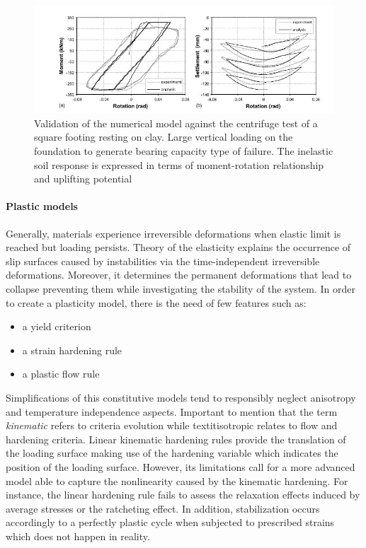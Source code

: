\documentclass[12pt,a4paper]{report}
\begin{document}
\begin{figure}[!h]
\centering
	\includegraphics[width=0.5 \linewidth]{"exper"}
	\caption{Validation of the numerical model against the centrifuge test of a square footing resting on clay. Large vertical loading on the foundation to generate bearing capacity type of failure. The inelastic soil response is expressed in terms of moment-rotation relationship and uplifting potential}
	\label{experimental}
\end{figure}

\paragraph{Plastic models} Generally, materials experience irreversible deformations when elastic limit is reached but loading persists. Theory of the elasticity explains the occurrence of slip surfaces caused by instabilities via the time-independent irreversible deformations. Moreover, it determines the permanent deformations that lead to collapse preventing them while investigating the stability of the system. 
In order to create a plasticity model, there is the need of few features such as:
\begin{itemize}
	\item a yield criterion\
	\item a strain hardening rule\
	\item a plastic flow rule\
\end{itemize}

Simplifications of this constitutive models tend to responsibly neglect anisotropy and \mbox{temperature} independence aspects. Important to mention that the term \textit{kinematic} refers to criteria evolution while textit{isotropic} relates to flow and hardening criteria. Linear kinematic hardening rules provide the translation of the loading surface making use of the hardening variable which indicates the position of the loading surface. However, its limitations call for a more advanced model able to capture the nonlinearity caused by the kinematic hardening. For instance, the linear hardening rule fails to assess the relaxation effects induced by average stresses or the ratcheting effect. In addition, stabilization occurs accordingly to a perfectly plastic cycle when subjected to prescribed strains which does not happen in reality.
\end{document}
